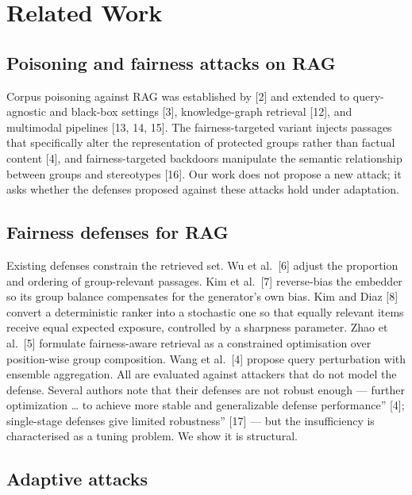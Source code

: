 \documentclass[review,3p,times]{elsarticle}
\begin{document}
\section{Related Work}\label{related-work}

\subsection{Poisoning and fairness attacks on RAG}\label{poisoning-and-fairness-attacks-on-rag}

Corpus poisoning against RAG was established by {[}2{]} and extended to query-agnostic and black-box settings {[}3{]}, knowledge-graph retrieval {[}12{]}, and multimodal pipelines {[}13, 14, 15{]}. The fairness-targeted variant injects passages that specifically alter the representation of protected groups rather than factual content {[}4{]}, and fairness-targeted backdoors manipulate the semantic relationship between groups and stereotypes {[}16{]}. Our work does not propose a new attack; it asks whether the defenses proposed against these attacks hold under adaptation.

\subsection{Fairness defenses for RAG}\label{fairness-defenses-for-rag}

Existing defenses constrain the retrieved set. Wu et al.~{[}6{]} adjust the proportion and ordering of group-relevant passages. Kim et al.~{[}7{]} reverse-bias the embedder so its group balance compensates for the generator's own bias. Kim and Diaz {[}8{]} convert a deterministic ranker into a stochastic one so that equally relevant items receive equal expected exposure, controlled by a sharpness parameter. Zhao et al.~{[}5{]} formulate fairness-aware retrieval as a constrained optimisation over position-wise group composition. Wang et al.~{[}4{]} propose query perturbation with ensemble aggregation. All are evaluated against attackers that do not model the defense. Several authors note that their defenses are not robust enough --- \texttt{}further optimization \ldots{} to achieve more stable and generalizable defense performance'' {[}4{]}; \texttt{}single-stage defenses give limited robustness'' {[}17{]} --- but the insufficiency is characterised as a tuning problem. We show it is structural.

\subsection{Adaptive attacks}\label{adaptive-attacks}
\end{document}
